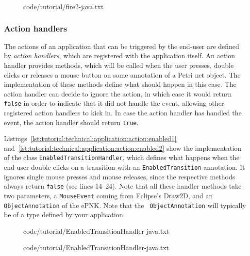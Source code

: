 \begin{figure}[htbp!]
%
  {code/tutorial/fire2-java.txt}
\end{figure}

\subsubsection{Action handlers}
\label{subsubsec:tutorial:technical:application:actionhandler}

The actions of an application that can be triggered by the end-user are defined
by \emph{action handlers}, which are registered with the application itself. An
action handler provides methods, which will be called when the user presses,
double clicks or releases a mouse button on some annotation of a Petri net
object. The implementation of these methods define what should happen in this
case. The action handler can decide to ignore the action, in which case it would
return {\tt false} in order to indicate that it did not handle the event,
allowing other registered action handlers to kick in. In case the action
handler has handled the event, the action handler should return  {\tt true}.

Listings~\ref{lst:tutorial:technical:application:action:enabled1}
and~\ref{lst:tutorial:technical:application:action:enabled2} show the
implementation of the class {\tt Enabled\optsep{}Transition\optsep{}Handler},
which defines what happens when the end-user double clicks on a transition
with an {\tt EnabledTransition}
annotation. It ignores single mouse presses and mouse releases, since the
respective methods always return {\tt false} (see lines 14--24). Note that all
these handler methods take two parameters, a  {\tt MouseEvent} coming from Eclipse's
Draw2D, and an {\tt Object\optsep{}Annotation} of the ePNK. Note that the {\tt
Object\optsep{}Annotation} will typically be of a type defined by your
application.

\begin{figure}[htbp!]
%
  {code/tutorial/EnabledTransitionHandler-java.txt}
\end{figure}

\begin{figure}[htbp!]
%
  {code/tutorial/EnabledTransitionHandler-java.txt}
\end{figure}

